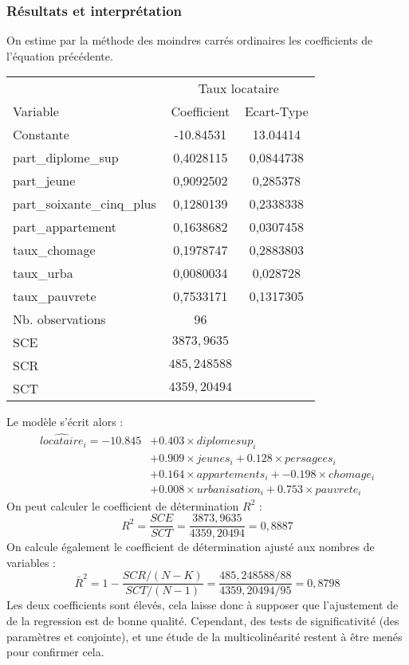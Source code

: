 \documentclass[]{article}
\begin{document}
\subsubsection{Résultats et interprétation}
On estime par la méthode des moindres carrés ordinaires les coefficients de l'équation précédente.
\begin{table}[H]
\centering
\begin{tabular}{l*{1}{cc}}
\toprule
            &\multicolumn{2}{c}{Taux locataire}\\
Variable            & Coefficient         &  Ecart-Type\\
\midrule
Constante & -10.84531 & 13.04414\\
part\_diplome\_sup	& 0,4028115	& 0,0844738\\
part\_jeune  & 0,9092502 & 0,285378\\
part\_soixante\_cinq\_plus& 0,1280139 & 0,2338338\\
part\_appartement& 0,1638682 & 0,0307458\\
taux\_chomage& 0,1978747 & 0,2883803\\
taux\_urba   & 0,0080034 & 0,028728\\
taux\_pauvrete& 0,7533171& 0,1317305\\
\midrule
Nb. observations&          96         &            \\
SCE & $3873,9635$ \\
SCR & $485,248588$ \\
SCT & $4359,20494$ \\
\bottomrule
\end{tabular}
\end{table}
Le modèle s'écrit alors : 
\begin{equation*}
    \begin{split}
			\hat{locataire}_i = -10.845 &+ 0.403 \times diplomesup_i \\
            &+ 0.909 \times jeunes_i + 0.128 \times persagees_i \\
            &+ 0.164 \times appartements_i + -0.198 \times chomage_i \\
            &+ 0.008 \times urbanisation_i + 0.753 \times pauvrete_i
    \end{split}
\end{equation*}
On peut calculer le coefficient de détermination $R^{2}$ :
\begin{equation*}
    R^{2} = \frac{SCE}{SCT} = \frac{3873,9635}{4359,20494} = 0,8887
\end{equation*}
On calcule également le coefficient de détermination ajusté aux nombres de variables :
\begin{equation*}
    \bar{R}^{2} = 1 - \frac{SCR/(N-K)}{SCT/(N-1)} = \frac{485,248588/88}{4359,20494/95} = 0,8798
\end{equation*}
Les deux coefficients sont élevés, cela laisse donc à supposer que l'ajustement de de la regression est de bonne qualité. Cependant, des tests de 
significativité (des paramètres et conjointe), et une étude de la multicolinéarité restent à être menés pour confirmer cela.
\end{document}
